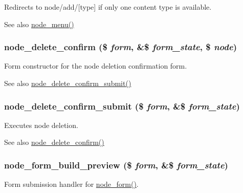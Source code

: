 Redirects to node/add/\mbox{[}type\mbox{]} if only one content type is available.

\begin{DoxySeeAlso}{See also}
\hyperlink{node_8module_a15e8d85a7559f22b8f2c77c1d5dfac63}{node\_\-menu()} 
\end{DoxySeeAlso}
\hypertarget{node_8pages_8inc_a6394c9476a3cbc56ba6130755f99497e}{
\subsubsection[{node\_\-delete\_\-confirm}]{\setlength{\rightskip}{0pt plus 5cm}node\_\-delete\_\-confirm (\$ {\em form}, \/  \&\$ {\em form\_\-state}, \/  \$ {\em node})}}
\label{node_8pages_8inc_a6394c9476a3cbc56ba6130755f99497e}
Form constructor for the node deletion confirmation form.

\begin{DoxySeeAlso}{See also}
\hyperlink{node_8pages_8inc_a2d744b2bdca2ec49b8eaa0fc7c69e1c3}{node\_\-delete\_\-confirm\_\-submit()} 
\end{DoxySeeAlso}
\hypertarget{node_8pages_8inc_a2d744b2bdca2ec49b8eaa0fc7c69e1c3}{
\subsubsection[{node\_\-delete\_\-confirm\_\-submit}]{\setlength{\rightskip}{0pt plus 5cm}node\_\-delete\_\-confirm\_\-submit (\$ {\em form}, \/  \&\$ {\em form\_\-state})}}
\label{node_8pages_8inc_a2d744b2bdca2ec49b8eaa0fc7c69e1c3}
Executes node deletion.

\begin{DoxySeeAlso}{See also}
\hyperlink{node_8pages_8inc_a6394c9476a3cbc56ba6130755f99497e}{node\_\-delete\_\-confirm()} 
\end{DoxySeeAlso}
\hypertarget{node_8pages_8inc_a71425b02d4c0dd3af239bffdd7e1649b}{
\subsubsection[{node\_\-form\_\-build\_\-preview}]{\setlength{\rightskip}{0pt plus 5cm}node\_\-form\_\-build\_\-preview (\$ {\em form}, \/  \&\$ {\em form\_\-state})}}
\label{node_8pages_8inc_a71425b02d4c0dd3af239bffdd7e1649b}
Form submission handler for \hyperlink{group__forms_ga267299500e205db099ee4e8396769d3f}{node\_\-form()}.

